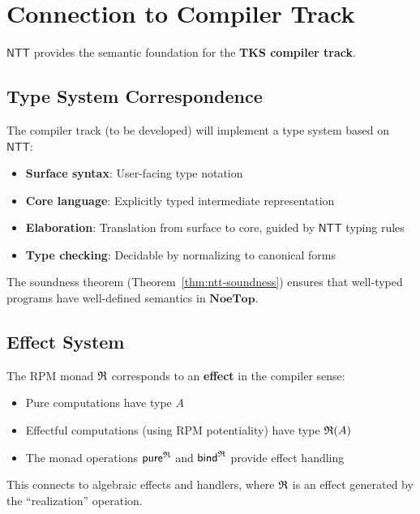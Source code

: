 \section{Connection to Compiler Track}
\label{sec:compiler-connection}

$\mathsf{NTT}$ provides the semantic foundation for the \textbf{TKS compiler track}.

\subsection{Type System Correspondence}
\label{subsec:type-system-correspondence}

\begin{remark}
\label{rem:compiler-types}
The compiler track (to be developed) will implement a type system based on
$\mathsf{NTT}$:
\begin{itemize}
  \item \textbf{Surface syntax}: User-facing type notation
  \item \textbf{Core language}: Explicitly typed intermediate representation
  \item \textbf{Elaboration}: Translation from surface to core, guided by
        $\mathsf{NTT}$ typing rules
  \item \textbf{Type checking}: Decidable by normalizing to canonical forms
\end{itemize}
The soundness theorem (Theorem~\ref{thm:ntt-soundness}) ensures that well-typed
programs have well-defined semantics in $\mathbf{NoeTop}$.
\end{remark}

\subsection{Effect System}
\label{subsec:effect-system}

\begin{remark}
\label{rem:rpm-effect}
The RPM monad $\mathfrak{R}$ corresponds to an \textbf{effect} in the compiler sense:
\begin{itemize}
  \item Pure computations have type $A$
  \item Effectful computations (using RPM potentiality) have type $\mathfrak{R}(A)$
  \item The monad operations $\mathsf{pure}^{\mathfrak{R}}$ and $\mathsf{bind}^{\mathfrak{R}}$
        provide effect handling
\end{itemize}
This connects to algebraic effects and handlers, where $\mathfrak{R}$ is an effect
generated by the ``realization'' operation.
\end{remark}

